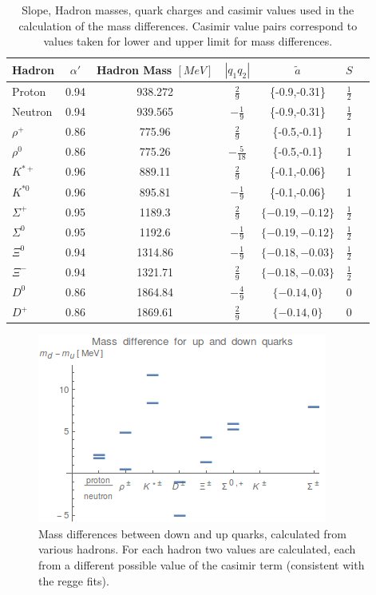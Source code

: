 \documentclass[11pt,a4paper]{article}
\begin{document}
\begin{table}
\centering
\begin{tabular}{|l|c|c|c|c|c|c|}
\hline
 Hadron & $\alpha'$ & Hadron Mass $\left[MeV\right]$ & $|q_1q_2|$ & $\tilde{a}$ & $S$ \\ 
 \hline
Proton & 0.94 & 938.272 & $\frac{2}{9}$ & \{-0.9,-0.31\} & $\frac{1}{2}$ \\
Neutron & 0.94 & 939.565 & $-\frac{1}{9}$ & \{-0.9,-0.31\} & $\frac{1}{2}$ \\
$\rho^{+}$ & 0.86 & 775.96 & $\frac{2}{9}$ & \{-0.5,-0.1\} & 1  \\
$\rho^{0}$ & 0.86 & 775.26 & $-\frac{5}{18}$ & \{-0.5,-0.1\} & 1  \\
$K^{*+}$ & 0.96 & 889.11 & $\frac{2}{9}$ & \{-0.1,-0.06\} & 1  \\
$K^{*0}$ & 0.96 & 895.81 & $-\frac{1}{9}$ & \{-0.1,-0.06\} & 1  \\
$\Sigma^+$ & 0.95 & 1189.3 & $\frac{2}{9}$ & $\{-0.19,-0.12\}$ & $\frac{1}{2}$  \\
$\Sigma^0$ & 0.95 & 1192.6 & $-\frac{1}{9}$ & $\{-0.19,-0.12\}$ & $\frac{1}{2}$  \\
$\Xi^0$ & 0.94 & 1314.86 & $-\frac{1}{9}$ & $\{-0.18,-0.03\}$ & $\frac{1}{2}$  \\
$\Xi^-$ & 0.94 & 1321.71 & $\frac{2}{9}$ & $\{-0.18,-0.03\}$ & $\frac{1}{2}$  \\
$D^0$ & 0.86 & 1864.84 & $-\frac{4}{9}$ & $\{-0.14,0\}$ & 0  \\
$D^+$ & 0.86 & 1869.61 & $\frac{2}{9}$ & $\{-0.14,0\}$ & 0  \\
\hline
\end{tabular}
\caption{Slope, Hadron masses, quark charges and casimir values used in the calculation of the mass differences. Casimir value pairs correspond to values taken for lower and upper limit for mass differences.}
\label{tab:massdiffdata}
\end{table}

\begin{figure}[h]
\centering
\includegraphics[scale=1]{figures/MassDifferences.png}
\caption{Mass differences between down and up quarks, calculated from various hadrons. For each hadron two values are calculated, each from a different possible value of the casimir term (consistent with the regge fits).}
\label{fig:massdiff}
\end{figure}
\end{document}
